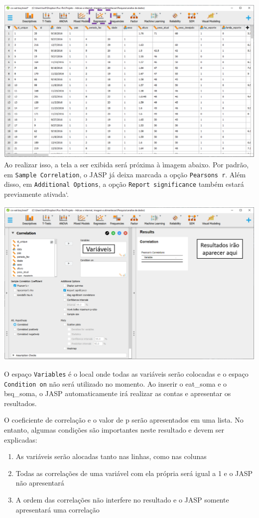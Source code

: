 \documentclass[
]{book}
\providecommand{\tightlist}{%
  \setlength{\itemsep}{0pt}\setlength{\parskip}{0pt}}
\begin{document}
\includegraphics{./img/cap_correlacao_interface.png}
Ao realizar isso, a tela a ser exibida será próxima à ìmagem abaixo. Por padrão, em \texttt{Sample\ Correlation}, o JASP já deixa marcada a opção \texttt{Pearson\textquotesingle{}s\ r}. Além disso, em \texttt{Additional\ Options}, a opção \texttt{Report\ significance} também estará previamente ativada`.

\includegraphics{./img/cap_correlacao_interface2.png}

O espaço \texttt{Variables} é o local onde todas as variáveis serão colocadas e o espaço \texttt{Condition\ on} não será utilizado no momento. Ao inserir o eat\_soma e o bsq\_soma, o JASP automaticamente irá realizar as contas e apresentar os resultados.

O coeficiente de correlação e o valor de p serão apresentados em uma lista. No entanto, algumas condições são importantes neste resultado e devem ser explicadas:

\begin{enumerate}
\def\labelenumi{\arabic{enumi}.}
\tightlist
\item
  As variáveis serão alocadas tanto nas linhas, como nas colunas\\
\item
  Todas as correlações de uma variável com ela própria será igual a 1 e o JASP não apresentará\\
\item
  A ordem das correlações não interfere no resultado e o JASP somente apresentará uma correlação
\end{enumerate}
\end{document}
